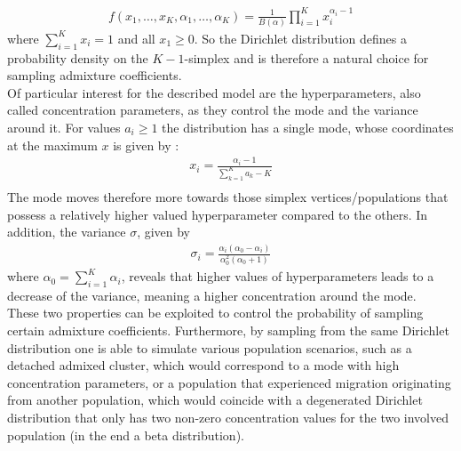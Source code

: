 \documentclass[a4paper, 11pt]{article}
\begin{document}
\begin{align*}
f(x_1, \ldots, x_K, \alpha_1, \ldots, \alpha_K) = \frac{1}{B(\alpha)} \prod^{K}_{i=1}x_i^{\alpha_i-1}
\end{align*}
where $\sum^{K}_{i =1} x_i = 1$ and all $x_1 \geq 0$. So the Dirichlet distribution defines a probability density on the $K-1$-simplex and is therefore a natural choice for sampling admixture coefficients. \\
Of particular interest for the described model are the hyperparameters, also called concentration parameters, as they control the mode and the variance around it. For values $a_i \geq 1$ the distribution has a single mode, whose coordinates at the maximum $x$ is given by \cite{bishop2006pattern}: 
\begin{align*}
x_i = \frac{\alpha_i - 1}{\sum^K_{k=1} a_k -K} \\
\end{align*}
The mode moves therefore more towards those simplex vertices/populations that possess a relatively higher valued hyperparameter compared to the others. In addition, the variance $\sigma$, given by 
\begin{align*}
\sigma_i = \frac{\alpha_i(\alpha_0 - \alpha_i)}{\alpha_0^2(\alpha_0 + 1)}
\end{align*} 
where $\alpha_0 = \sum^{K}_{i = 1} \alpha_i$, reveals that higher values of hyperparameters leads to a decrease of the variance, meaning a higher concentration around the mode. \\
These two properties can be exploited to control the probability of sampling certain admixture coefficients. Furthermore, by sampling from the same Dirichlet distribution one is able to simulate various population scenarios, such as a detached admixed cluster, which would correspond to a mode with high concentration parameters, or a population that experienced migration originating from another population, which would coincide with a degenerated Dirichlet distribution that only has two non-zero concentration values for the two involved population (in the end a beta distribution).
\end{document}
